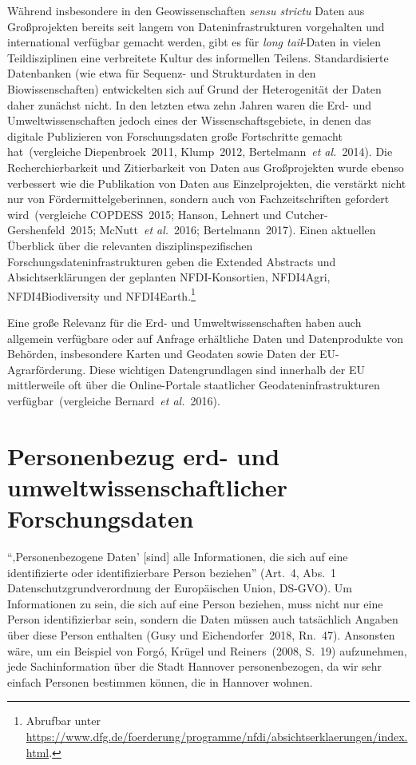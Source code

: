\documentclass[a4paper,
fontsize=11pt,
oneside,
numbers=noperiodatend,
parskip=half-,
bibliography=totoc,
final
]{scrartcl}
\begin{document}
Während insbesondere in den Geowissenschaften \emph{sensu strictu} Daten
aus Großprojekten bereits seit langem von Dateninfrastrukturen
vorgehalten und international verfügbar gemacht werden, gibt es für
\emph{long tail}-Daten in vielen Teildisziplinen eine verbreitete Kultur
des informellen Teilens. Standardisierte Datenbanken (wie etwa für
Sequenz- und Strukturdaten in den Biowissenschaften) entwickelten sich
auf Grund der Heterogenität der Daten daher zunächst nicht. In den
letzten etwa zehn Jahren waren die Erd- und Umweltwissenschaften jedoch
eines der Wissenschaftsgebiete, in denen das digitale Publizieren von
Forschungsdaten große Fortschritte gemacht hat~(vergleiche
Diepenbroek~2011, Klump~2012, Bertelmann~\emph{et al.}~2014). Die
Recherchierbarkeit und Zitierbarkeit von Daten aus Großprojekten wurde
ebenso verbessert wie die Publikation von Daten aus Einzelprojekten, die
verstärkt nicht nur von Fördermittelgeberinnen, sondern auch von
Fachzeitschriften gefordert wird~(vergleiche COPDESS~2015; Hanson,
Lehnert und Cutcher-Gershenfeld~2015; McNutt~\emph{et al.}~2016;
Bertelmann~2017). Einen aktuellen Überblick über die relevanten
disziplinspezifischen Forschungsdateninfrastrukturen geben die Extended
Abstracts und Absichtserklärungen der geplanten NFDI-Konsortien,
NFDI4Agri, NFDI4Biodiversity und NFDI4Earth.\footnote{Abrufbar unter
  \url{https://www.dfg.de/foerderung/programme/nfdi/absichtserklaerungen/index.html}.}

Eine große Relevanz für die Erd- und Umweltwissenschaften haben auch
allgemein verfügbare oder auf Anfrage erhältliche Daten und
Datenprodukte von Behörden, insbesondere Karten und Geodaten sowie Daten
der EU-Agrarförderung. Diese wichtigen Datengrundlagen sind innerhalb
der EU mittlerweile oft über die Online-Portale staatlicher
Geodateninfrastrukturen verfügbar~(vergleiche Bernard~\emph{et
al.}~2016).

\hypertarget{personenbezug-erd--und-umweltwissenschaftlicher-forschungsdaten}{%
\section{Personenbezug erd- und umweltwissenschaftlicher Forschungsdaten}\label{personenbezug-erd--und-umweltwissenschaftlicher-forschungsdaten}}

\enquote{‚Personenbezogene Daten' {[}sind{]} alle Informationen, die
sich auf eine identifizierte oder identifizierbare Person beziehen}
(Art.~4, Abs.~1 Datenschutzgrundverordnung der Europäischen Union,
DS-GVO). Um Informationen zu sein, die sich auf eine Person beziehen,
muss nicht nur eine Person identifizierbar sein, sondern die Daten
müssen auch tatsächlich Angaben über diese Person enthalten (Gusy und
Eichendorfer~2018, Rn.~47). Ansonsten wäre, um ein Beispiel von Forgó,
Krügel und Reiners~(2008, S.~19) aufzunehmen, jede Sachinformation über
die Stadt Hannover personenbezogen, da wir sehr einfach Personen
bestimmen können, die in Hannover wohnen.
\end{document}
